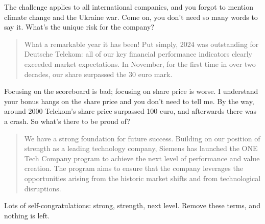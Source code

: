 The challenge applies to all international companies, and you forgot to mention climate change and the Ukraine war.
Come on, you don't need so many words to say it. What's the unique risk for the company?

\begin{quote}
    What a remarkable year it has been! Put simply, 2024 was outstanding for Deutsche Telekom: all of our key financial performance indicators clearly exceeded market expectations. In November, for the first time in over two decades, our share surpassed the 30 euro mark.
\end{quote}

Focusing on the scoreboard is bad; focusing on share price is worse. I understand your bonus hangs on the share price and you don't need to tell me. By the way, around 2000 Telekom's share price surpassed 100 euro, and afterwards there was a crash. So what's there to be proud of?

\begin{quote}
    We have a strong foundation for future success. Building on our position of 
strength as a leading technology company, Siemens has launched the 
ONE Tech Company program to achieve the next level of performance and value 
creation. The program aims to ensure that the company leverages the 
opportunities arising from the historic market shifts and from technological 
disruptions. 
\end{quote}

Lots of self-congratulations: strong, strength, next level. Remove these terms, and nothing is left.


